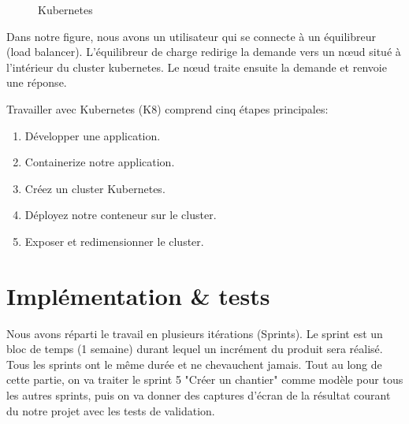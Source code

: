 \begin{itemize}
\begin{figure}[H]
	\caption{\label{fig:my-label} Kubernetes}
\end{figure}

Dans notre figure, nous avons un utilisateur qui se connecte \`a un \'equilibreur (load balancer). L'\'equilibreur de charge redirige la demande vers un n\oe{}ud situ\'e \`a l'int\'erieur du cluster kubernetes. Le n\oe{}ud traite ensuite la demande et renvoie une r\'eponse.

Travailler avec Kubernetes (K8) comprend cinq \'etapes principales:
\begin{enumerate}
\item D\'evelopper une application.
\item Containerize notre application.
\item Cr\'eez un cluster Kubernetes.
\item D\'eployez notre conteneur sur le cluster.
\item Exposer et redimensionner le cluster.
\end{enumerate}

\end{itemize}




\section{Impl\'ementation \& tests}

Nous avons r\'eparti le travail en plusieurs it\'erations (Sprints). Le sprint est un bloc de temps (1 semaine) durant lequel un incr\'ement du produit sera r\'ealis\'e. Tous les sprints ont le m\^eme dur\'ee et ne chevauchent jamais. Tout au long de cette partie, on va traiter le sprint 5 "Cr\'eer un chantier" comme mod\`ele pour tous les autres sprints, puis on va donner des captures d'\'ecran de la r\'esultat courant du notre projet avec les tests de validation.


